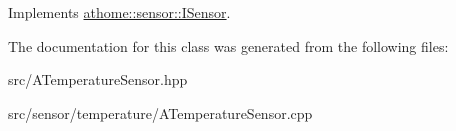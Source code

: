 Implements \mbox{\hyperlink{classathome_1_1sensor_1_1_i_sensor_af86df8538fecfcfc670b4adfbbde6abb}{athome\+::sensor\+::\+I\+Sensor}}.



The documentation for this class was generated from the following files\+:\begin{DoxyCompactItemize}
\item 
src/A\+Temperature\+Sensor.\+hpp\item 
src/sensor/temperature/A\+Temperature\+Sensor.\+cpp\end{DoxyCompactItemize}
